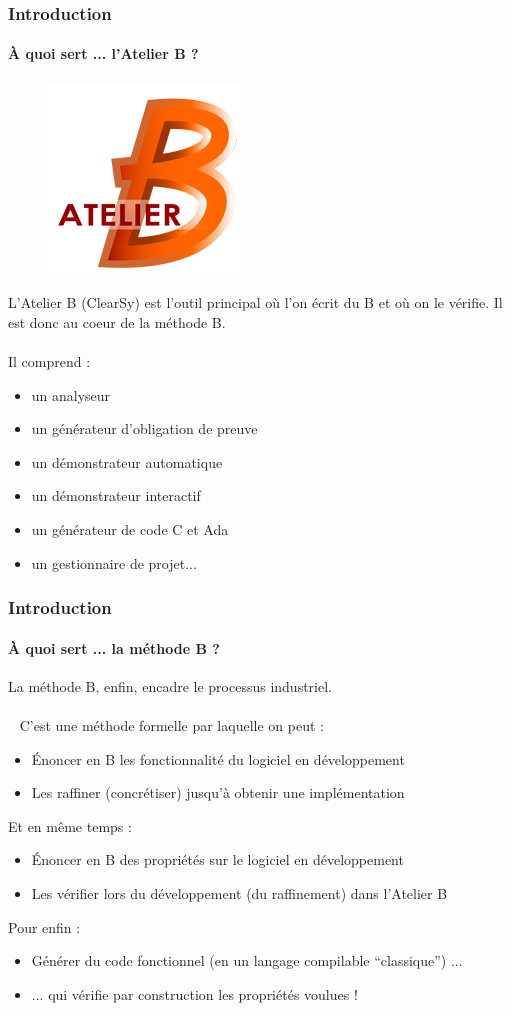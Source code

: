 \documentclass[11pt,a4paper,xcolor=table]{beamer} %
\begin{document}
\begin{frame}
\frametitle{Introduction}
\framesubtitle{À quoi sert ... l'Atelier B ?}
\begin{figure}[h]
\centering
\includegraphics[scale=0.33]{ressources/logo.png}
\end{figure}
L'Atelier B (ClearSy) est l'outil principal où l'on écrit du B et où on le vérifie. Il est donc au coeur de la méthode B.\\~\\
\pause
Il comprend :
\begin{itemize}
\item un analyseur
\pause
\item un générateur d'obligation de preuve
\pause
\item un démonstrateur automatique
\pause
\item un démonstrateur interactif
\pause
\item un générateur de code C et Ada
\pause
\item un gestionnaire de projet...
\end{itemize}
\end{frame}

\begin{frame}
\frametitle{Introduction}
\framesubtitle{À quoi sert ... la méthode B ?}
La méthode B, enfin, encadre le processus industriel.\\~\\~\pause
C'est une méthode formelle par laquelle on peut :\pause
\begin{itemize}
\item Énoncer en B les fonctionnalité du logiciel en développement
\pause
\item Les raffiner (concrétiser) jusqu'à obtenir une implémentation
\pause
\end{itemize}
Et en même temps :\pause
\begin{itemize}
\item Énoncer en B des propriétés sur le logiciel en développement
\pause
\item Les vérifier lors du développement (du raffinement) dans l'Atelier B
\pause
\end{itemize}
Pour enfin :
\begin{itemize}
\item Générer du code fonctionnel (en un langage compilable ``classique'') ...
\pause
\item ... qui vérifie par construction les propriétés voulues !
\end{itemize}
\end{frame}
\end{document}
